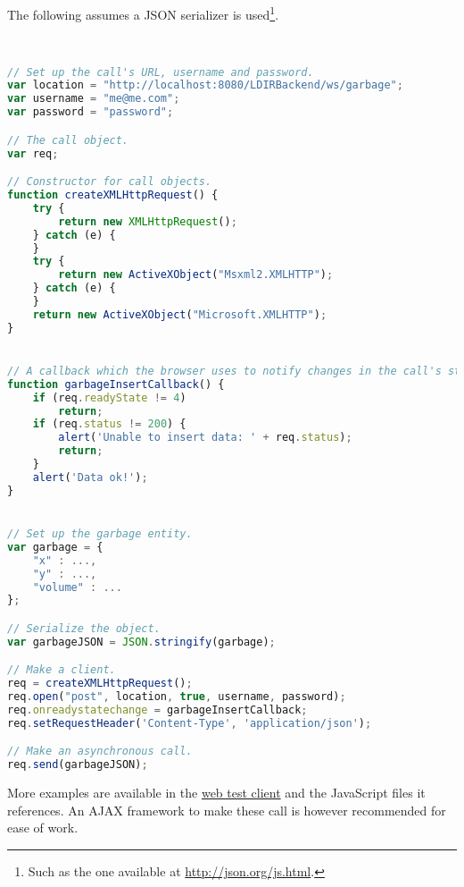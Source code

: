The following assumes a JSON serializer is used\footnote{Such as the one
available at \url{http://json.org/js.html}.}.
\begin{lstlisting}[language=JavaScript]


// Set up the call's URL, username and password.
var location = "http://localhost:8080/LDIRBackend/ws/garbage";
var username = "me@me.com";
var password = "password";

// The call object.
var req;

// Constructor for call objects.
function createXMLHttpRequest() {
    try {
        return new XMLHttpRequest();
    } catch (e) {
    }
    try {
        return new ActiveXObject("Msxml2.XMLHTTP");
    } catch (e) {
    }
    return new ActiveXObject("Microsoft.XMLHTTP");
}


// A callback which the browser uses to notify changes in the call's state.
function garbageInsertCallback() {
    if (req.readyState != 4)
        return;
    if (req.status != 200) {
        alert('Unable to insert data: ' + req.status);
        return;
    }
    alert('Data ok!');
}


// Set up the garbage entity.
var garbage = {
    "x" : ...,
    "y" : ...,
    "volume" : ...
};

// Serialize the object.
var garbageJSON = JSON.stringify(garbage);

// Make a client.
req = createXMLHttpRequest();
req.open("post", location, true, username, password);
req.onreadystatechange = garbageInsertCallback;
req.setRequestHeader('Content-Type', 'application/json');

// Make an asynchronous call.
req.send(garbageJSON);
\end{lstlisting}

More examples are available in the
\href{http://code.google.com/p/letsdoitromania2011/source/browse/trunk/Web/Service/LDIRBackendWeb/WebContent/index.html}{web
test client} and the JavaScript files it references.  An AJAX framework to make
these call is however recommended for ease of work.
